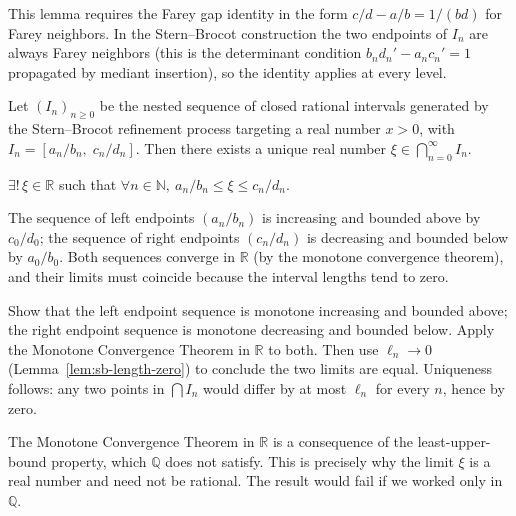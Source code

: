 \begin{remark}
This lemma requires the Farey gap identity in the form $c/d - a/b = 1/(bd)$
for Farey neighbors.  In the Stern--Brocot construction the two endpoints
of $I_n$ are always Farey neighbors (this is the determinant condition
$b_n d_n' - a_n c_n' = 1$ propagated by mediant insertion), so the
identity applies at every level.
\end{remark}


\begin{proposition}
\label{prop:sb-unique-point}
Let $(I_n)_{n \ge 0}$ be the nested sequence of closed rational intervals
generated by the Stern--Brocot refinement process targeting a real number
$x > 0$, with $I_n = [a_n/b_n,\; c_n/d_n]$.  Then there exists a unique
real number $\xi \in \bigcap_{n=0}^{\infty} I_n$.
\end{proposition}

\begin{remark}
$\exists!\, \xi \in \mathbb{R}$ such that
$\forall n \in \mathbb{N},\ a_n/b_n \le \xi \le c_n/d_n$.
\end{remark}

\begin{remark}[Intuition]
The sequence of left endpoints $(a_n/b_n)$ is increasing and bounded above
by $c_0/d_0$; the sequence of right endpoints $(c_n/d_n)$ is decreasing and
bounded below by $a_0/b_0$.  Both sequences converge in $\mathbb{R}$
(by the monotone convergence theorem), and their limits must coincide
because the interval lengths tend to zero.
\end{remark}

\begin{remark}
Show that the left endpoint sequence is monotone increasing and bounded
above; the right endpoint sequence is monotone decreasing and bounded
below.  Apply the Monotone Convergence Theorem in $\mathbb{R}$ to both.
Then use $\ell_n \to 0$ (Lemma~\ref{lem:sb-length-zero}) to conclude
the two limits are equal.  Uniqueness follows: any two points in
$\bigcap I_n$ would differ by at most $\ell_n$ for every $n$, hence
by zero.
\end{remark}

\begin{remark}
The Monotone Convergence Theorem in $\mathbb{R}$ is a consequence of the
least-upper-bound property, which $\mathbb{Q}$ does not satisfy.  This is
precisely why the limit $\xi$ is a real number and need not be rational.
The result would fail if we worked only in $\mathbb{Q}$.
\end{remark}

